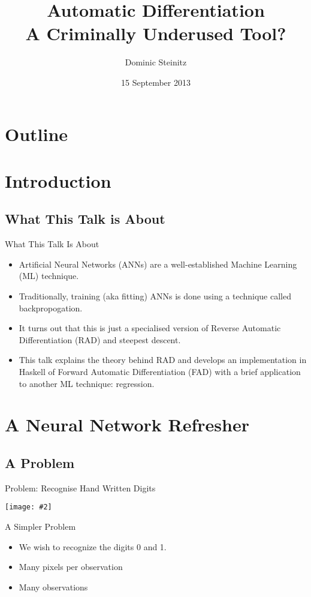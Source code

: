 \documentclass{beamer}
\title[Automatic differentiation]{Automatic Differentiation\\A Criminally Underused Tool?}
\author{Dominic Steinitz}
\institute{Kingston University}
\date{15 September 2013}
\newcommand {\framedgraphic}[2] {
    \begin{frame}{#1}
        \begin{center}
            \texttt{[image: \#2]}
        \end{center}
    \end{frame}
}
\begin{document}
\begin{frame}
\titlepage
\end{frame}

\section*{Outline}
    \frame{\tableofcontents}

\section{Introduction}

\subsection{What This Talk is About}

\begin{frame}{What This Talk Is About}

  \begin{itemize}
  \item Artificial Neural Networks (ANNs) are a well-established
    Machine Learning (ML) technique.
  \item Traditionally, training (aka fitting) ANNs is done using a
    technique called backpropogation.
  \item It turns out that this is just a specialised version of
    Reverse Automatic Differentiation (RAD) and steepest descent.
  \item This talk explains the theory behind RAD and develops an
    implementation in Haskell of Forward Automatic Differentiation
    (FAD) with a brief application to another ML technique:
    regression.
  \end{itemize}

\end{frame}

\section{A Neural Network Refresher}

\subsection{A Problem}

\framedgraphic{Problem: Recognise Hand Written Digits}{diagrams/mnist_originals.png}

\begin{frame}[fragile]{A Simpler Problem}
\begin{itemize}
\item We wish to recognize the digits 0 and 1.
\item Many pixels per observation
\item Many observations
\end{itemize}
\end{frame}
\end{document}
